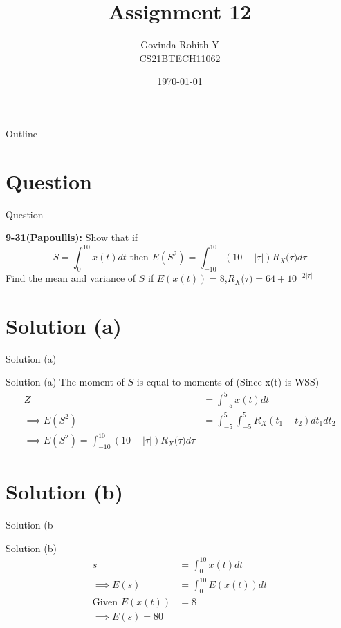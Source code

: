\documentclass{beamer}
\title{Assignment 12}
\author{Govinda Rohith Y\\CS21BTECH11062}
\date{\today}
\providecommand{\abs}[1]{\left\vert#1\right\vert}
\begin{document}
\begin{frame}
    \titlepage 
\end{frame}

\logo{}


\begin{frame}{Outline}
    \tableofcontents
\end{frame}


\section{Question}
\begin{frame}{Question}

\begin{block}{\textbf{9-31(Papoullis):}}
        Show that if
        $$S=\int_0^{10}x(t)dt \text{ then } E(S^2)=\int_{-10}^{10}(10-\abs{\tau})R_X{(\tau})d\tau$$
        Find the mean and variance of $S$ if $E(x(t))=8$,$R_X{(\tau})=64+10^{-2\abs{\tau}}$
    \end{block}
    \end{frame}
    \section{Solution (a)}
    \begin{frame}{Solution (a)}
        \begin{block}{Solution (a)}
        The moment of $S$ is equal to moments of (Since x(t) is WSS)
        \begin{align}
            Z&=\int_{-5}^{5}x(t)dt\\
            \implies E(S^2)&=\int_{-5}^{5}\int_{-5}^{5}R_X(t_1-t_2)dt_1dt_2\\
            \implies\boxed{E(S^2)=\int_{-10}^{10}(10-\abs{\tau})R_X{(\tau})d\tau}
        \end{align}
        \end{block}
    \end{frame}
    
    \section{Solution (b)}
    \begin{frame}{Solution (b}
        \begin{block}{Solution (b)}
        \begin{align}
        s&=\int_0^{10}x(t)dt\\
        \implies E(s)&=\int_0^{10}E(x(t))dt\\
        \text{Given }E(x(t))&=8\\
        \implies \boxed{E(s)=80}
        \end{align}
        \end{block}
    \end{frame}
\end{document}
